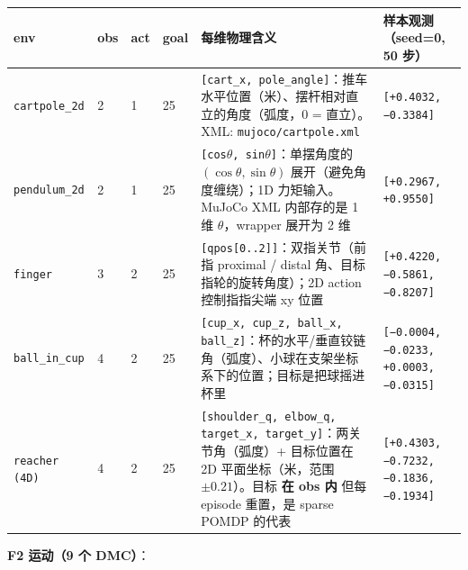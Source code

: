 \documentclass[11pt,a4paper]{article}
\begin{document}
\begingroup\scriptsize
\begin{longtable}{p{}p{}p{}p{}p{}p{}}
\toprule
\textbf{env} & \textbf{obs} & \textbf{act} & \textbf{goal} & \textbf{每维物理含义} & \textbf{样本观测（seed=0, 50 步）} \\
\midrule
\endhead
\texttt{cartpole\_2d}     & 2 & 1 & 25 & \texttt{[cart\_x, pole\_angle]}：推车水平位置（米）、摆杆相对直立的角度（弧度，0 = 直立）。XML: \texttt{mujoco/cartpole.xml} & \texttt{[+0.4032, −0.3384]} \\
\texttt{pendulum\_2d}     & 2 & 1 & 25 & \texttt{[cos$\theta$, sin$\theta$]}：单摆角度的 $(\cos\theta,\sin\theta)$ 展开（避免角度缠绕）；1D 力矩输入。MuJoCo XML 内部存的是 1 维 $\theta$，wrapper 展开为 2 维 & \texttt{[+0.2967, +0.9550]} \\
\texttt{finger}          & 3 & 2 & 25 & \texttt{[qpos[0..2]]}：双指关节（前指 proximal / distal 角、目标指轮的旋转角度）；2D action 控制指指尖端 xy 位置 & \texttt{[+0.4220, −0.5861, −0.8207]} \\
\texttt{ball\_in\_cup}    & 4 & 2 & 25 & \texttt{[cup\_x, cup\_z, ball\_x, ball\_z]}：杯的水平/垂直铰链角（弧度）、小球在支架坐标系下的位置；目标是把球摇进杯里 & \texttt{[−0.0004, −0.0233, +0.0003, −0.0315]} \\
\texttt{reacher (4D)}    & 4 & 2 & 25 & \texttt{[shoulder\_q, elbow\_q, target\_x, target\_y]}：两关节角（弧度）+ 目标位置在 2D 平面坐标（米，范围 $\pm 0.21$）。目标 \textbf{在 obs 内} 但每 episode 重置，是 sparse POMDP 的代表 & \texttt{[+0.4303, −0.7232, −0.1836, −0.1934]} \\
\bottomrule
\end{longtable}
\endgroup

\textbf{F2 运动（9 个 DMC）}：
\end{document}
